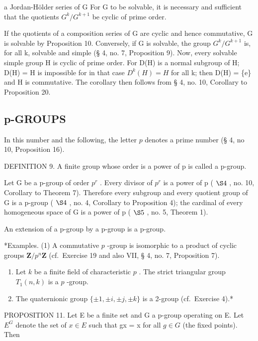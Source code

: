 a Jordan-Hölder series of G For G to be solvable, it is necessary and sufficient that the quotients \(G^{k}/G^{k+1}\) be cyclic of prime order.

If the quotients of a composition series of G are cyclic and hence commutative, G is solvable by Proposition 10. Conversely, if G is solvable, the group \(G^{k}/G^{k+1}\) is, for all k, solvable and simple (§ 4, no. 7, Proposition 9). Now, every solvable simple group H is cyclic of prime order. For D(H) is a normal subgroup of H; D(H) = H is impossible for in that case \(D^{k}(H) = H\) for all k; then D(H) = \{e\} and H is commutative. The corollary then follows from § 4, no. 10, Corollary to Proposition 20.

\subsection{p-GROUPS}

In this number and the following, the letter \(p\) denotes a prime number (§ 4, no 10, Proposition 16).

DEFINITION 9. A finite group whose order is a power of p is called a p-group.

Let G be a p-group of order \(p^{r}\) . Every divisor of \(p^{r}\) is a power of p ( \(\S 4\) , no. 10, Corollary to Theorem 7). Therefore every subgroup and every quotient group of G is a p-group ( \(\S 4\) , no. 4, Corollary to Proposition 4); the cardinal of every homogeneous space of G is a power of p ( \(\S 5\) , no. 5, Theorem 1).

An extension of a p-group by a p-group is a p-group.

*Examples. (1) A commutative \(p\) -group is isomorphic to a product of cyclic groups \(\mathbf{Z} / p^n\mathbf{Z}\) (cf.~Exercise 19 and also VII, § 4, no. 7, Proposition 7).

\begin{enumerate}
\def\labelenumi{(\arabic{enumi})}
\setcounter{enumi}{1}
\item
  Let \(k\) be a finite field of characteristic \(p\) . The strict triangular group \(T_1(n, k)\) is a \(p\) -group.
\item
  The quaternionic group \(\{\pm 1, \pm i, \pm j, \pm k\}\) is a 2-group (cf.~Exercise 4).*
\end{enumerate}

PROPOSITION 11. Let E be a finite set and G a p-group operating on E. Let \(E^{G}\) denote the set of \(x \in E\) such that gx = x for all \(g \in G\) (the fixed points). Then


